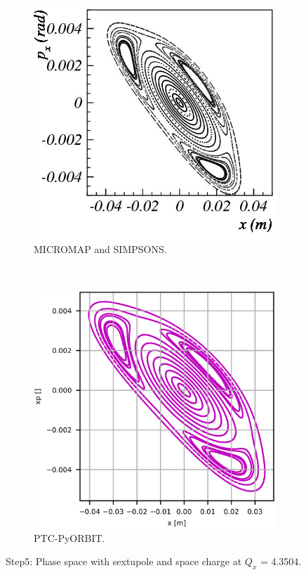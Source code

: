 \documentclass[a4paper]{cernatsnote}
\begin{document}
\begin{figure}
        \centering
        \begin{subfigure}{.5\textwidth}
          \centering
          \includegraphics[width=\textwidth]{Step5_phase-space.png}
          \caption{MICROMAP and SIMPSONS.}
          \label{fig:step5_m}
        \end{subfigure}~~~~~~
        \begin{subfigure}{.5\textwidth}
          \centering
          \includegraphics[width=\textwidth]{Step5_phase-space_PO.png}
          \caption{PTC-PyORBIT.}
          \label{fig:step1_po}
        \end{subfigure}
        \caption{Step5: Phase space with sextupole and space charge at $Q_x$ = 4.3504.}
        \label{fig:step1}
\end{figure}
\end{document}
